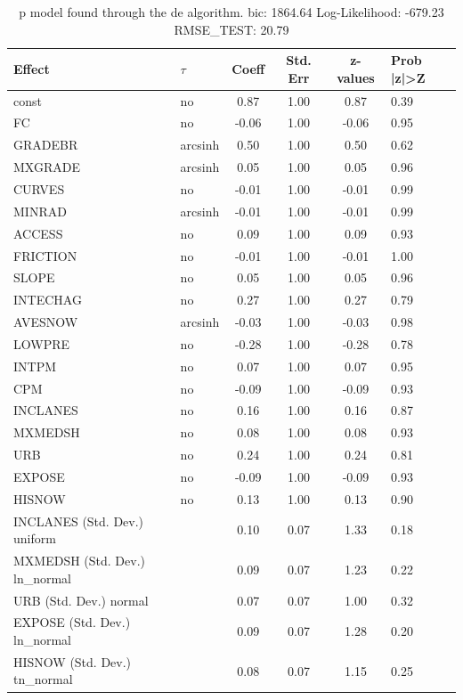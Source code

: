 \begin{table}
	\caption{p model found through the de algorithm. bic: 1864.64 Log-Likelihood: -679.23 RMSE_TEST: 20.79}
	\begin{center}
		\begin{tabular}{|l|l|c|c|c|l|}
			\hline
			Effect & $\tau$ & Coeff & Std. Err & z-values & Prob |z|>Z \\
			\hline
			const & no & 0.87 & 1.00 & 0.87 & 0.39 \\
			\hline
			FC & no & -0.06 & 1.00 & -0.06 & 0.95 \\
			\hline
			GRADEBR & arcsinh & 0.50 & 1.00 & 0.50 & 0.62 \\
			\hline
			MXGRADE & arcsinh & 0.05 & 1.00 & 0.05 & 0.96 \\
			\hline
			CURVES & no & -0.01 & 1.00 & -0.01 & 0.99 \\
			\hline
			MINRAD & arcsinh & -0.01 & 1.00 & -0.01 & 0.99 \\
			\hline
			ACCESS & no & 0.09 & 1.00 & 0.09 & 0.93 \\
			\hline
			FRICTION & no & -0.01 & 1.00 & -0.01 & 1.00 \\
			\hline
			SLOPE & no & 0.05 & 1.00 & 0.05 & 0.96 \\
			\hline
			INTECHAG & no & 0.27 & 1.00 & 0.27 & 0.79 \\
			\hline
			AVESNOW & arcsinh & -0.03 & 1.00 & -0.03 & 0.98 \\
			\hline
			LOWPRE & no & -0.28 & 1.00 & -0.28 & 0.78 \\
			\hline
			INTPM & no & 0.07 & 1.00 & 0.07 & 0.95 \\
			\hline
			CPM & no & -0.09 & 1.00 & -0.09 & 0.93 \\
			\hline
			INCLANES & no & 0.16 & 1.00 & 0.16 & 0.87 \\
			\hline
			MXMEDSH & no & 0.08 & 1.00 & 0.08 & 0.93 \\
			\hline
			URB & no & 0.24 & 1.00 & 0.24 & 0.81 \\
			\hline
			EXPOSE & no & -0.09 & 1.00 & -0.09 & 0.93 \\
			\hline
			HISNOW & no & 0.13 & 1.00 & 0.13 & 0.90 \\
			\hline
			INCLANES (Std. Dev.) uniform &  & 0.10 & 0.07 & 1.33 & 0.18 \\
			\hline
			MXMEDSH (Std. Dev.) ln_normal &  & 0.09 & 0.07 & 1.23 & 0.22 \\
			\hline
			URB (Std. Dev.) normal &  & 0.07 & 0.07 & 1.00 & 0.32 \\
			\hline
			EXPOSE (Std. Dev.) ln_normal &  & 0.09 & 0.07 & 1.28 & 0.20 \\
			\hline
			HISNOW (Std. Dev.) tn_normal &  & 0.08 & 0.07 & 1.15 & 0.25 \\
			\hline
		\end{tabular}
	\end{center}
\end{table}